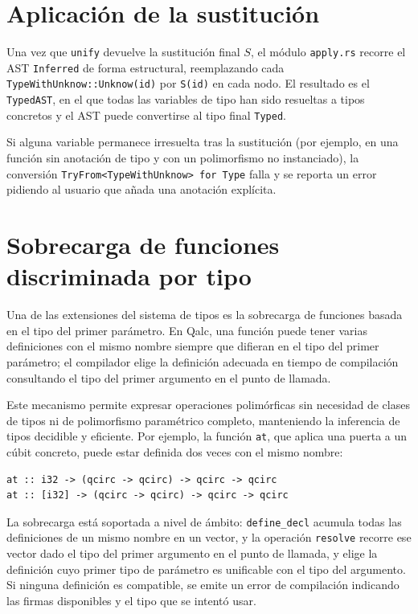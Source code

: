 \section{Aplicación de la sustitución}

Una vez que \lstinline|unify| devuelve la sustitución final $S$, el módulo \lstinline|apply.rs| recorre el AST \lstinline|Inferred| de forma estructural, reemplazando cada \lstinline|TypeWithUnknow::Unknow(id)| por \lstinline|S(id)| en cada nodo. El resultado es el \lstinline|TypedAST|, en el que todas las variables de tipo han sido resueltas a tipos concretos y el AST puede convertirse al tipo final \lstinline|Typed|.

Si alguna variable permanece irresuelta tras la sustitución (por ejemplo, en una función sin anotación de tipo y con un polimorfismo no instanciado), la conversión \lstinline|TryFrom<TypeWithUnknow> for Type| falla y se reporta un error pidiendo al usuario que añada una anotación explícita.

\section{Sobrecarga de funciones discriminada por tipo}
\label{sec:overloading}

Una de las extensiones del sistema de tipos es la sobrecarga de funciones basada en el tipo del primer parámetro. En Qalc, una función puede tener varias definiciones con el mismo nombre siempre que difieran en el tipo del primer parámetro; el compilador elige la definición adecuada en tiempo de compilación consultando el tipo del primer argumento en el punto de llamada.

Este mecanismo permite expresar operaciones polimórficas sin necesidad de clases de tipos ni de polimorfismo paramétrico completo, manteniendo la inferencia de tipos decidible y eficiente. Por ejemplo, la función \lstinline|at|, que aplica una puerta a un cúbit concreto, puede estar definida dos veces con el mismo nombre:

\begin{lstlisting}[language={}, caption=Ejemplo de sobrecarga de función discriminada por tipo del primer parámetro]
at :: i32 -> (qcirc -> qcirc) -> qcirc -> qcirc
at :: [i32] -> (qcirc -> qcirc) -> qcirc -> qcirc
\end{lstlisting}

La sobrecarga está soportada a nivel de ámbito: \lstinline|define_decl| acumula todas las definiciones de un mismo nombre en un vector, y la operación \lstinline|resolve| recorre ese vector dado el tipo del primer argumento en el punto de llamada, y elige la definición cuyo primer tipo de parámetro es unificable con el tipo del argumento. Si ninguna definición es compatible, se emite un error de compilación indicando las firmas disponibles y el tipo que se intentó usar.

